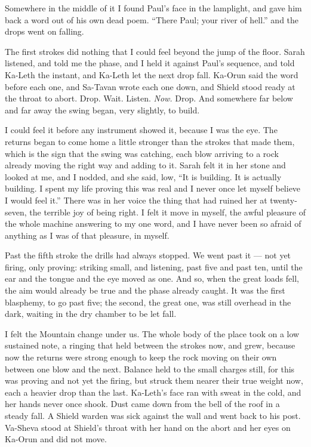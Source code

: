 Somewhere in the middle of it I found Paul's face in the lamplight, and gave him back a word out of his own dead poem. ``There Paul; your river of hell.'' and the drops went on falling.\par

The first strokes did nothing that I could feel beyond the jump of the floor. Sarah listened, and told me the phase, and I held it against Paul's sequence, and told Ka-Leth the instant, and Ka-Leth let the next drop fall. Ka-Orun said the word before each one, and Sa-Tavan wrote each one down, and Shield stood ready at the throat to abort. Drop. Wait. Listen. \emph{Now.} Drop. And somewhere far below and far away the swing began, very slightly, to build.\par

I could feel it before any instrument showed it, because I was the eye. The returns began to come home a little stronger than the strokes that made them, which is the sign that the swing was catching, each blow arriving to a rock already moving the right way and adding to it. Sarah felt it in her stone and looked at me, and I nodded, and she said, low, ``It is building. It is actually building. I spent my life proving this was real and I never once let myself believe I would feel it.'' There was in her voice the thing that had ruined her at twenty-seven, the terrible joy of being right. I felt it move in myself, the awful pleasure of the whole machine answering to my one word, and I have never been so afraid of anything as I was of that pleasure, in myself.\par

\ornament

Past the fifth stroke the drills had always stopped. We went past it --- not yet firing, only proving: striking small, and listening, past five and past ten, until the ear and the tongue and the eye moved as one. And so, when the great loads fell, the aim would already be true and the phase already caught. It was the first blasphemy, to go past five; the second, the great one, was still overhead in the dark, waiting in the dry chamber to be let fall.\par

I felt the Mountain change under us. The whole body of the place took on a low sustained note, a ringing that held between the strokes now, and grew, because now the returns were strong enough to keep the rock moving on their own between one blow and the next. Balance held to the small charges still, for this was proving and not yet the firing, but struck them nearer their true weight now, each a heavier drop than the last. Ka-Leth's face ran with sweat in the cold, and her hands never once shook. Dust came down from the bell of the roof in a steady fall. A Shield warden was sick against the wall and went back to his post. Va-Sheva stood at Shield's throat with her hand on the abort and her eyes on Ka-Orun and did not move.\par

